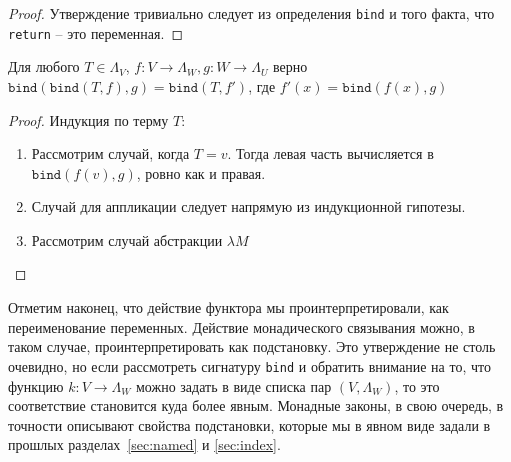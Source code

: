\begin{proof}
  Утверждение тривиально следует из определения \texttt{bind} и того факта, что \texttt{return} -- это переменная.
\end{proof}

\begin{prop}
  Для любого $T \in \Lambda_{V}$, $f : V \to \Lambda_{W}, g : W \to \Lambda_{U}$ верно $\texttt{bind}(\texttt{bind}(T, f), g) = \texttt{bind}(T, f')$, где $f'(x) = \texttt{bind}(f(x), g)$
\end{prop}

\begin{proof}
  Индукция по терму $T$:
  \begin{enumerate}
    \item Рассмотрим случай, когда $T = v$. Тогда левая часть вычисляется в $\texttt{bind}(f(v), g)$, ровно как и правая.
    \item Случай для аппликации следует напрямую из индукционной гипотезы.
    \item Рассмотрим случай абстракции $\lambda M$
  \end{enumerate}
\end{proof}


Отметим наконец, что действие функтора мы проинтерпретировали, как переименование переменных. Действие монадического связывания можно, в таком случае, проинтерпретировать как подстановку. Это утверждение не столь очевидно, но если рассмотреть сигнатуру \texttt{bind} и обратить внимание на то, что функцию $k : V \to \Lambda_{W}$ можно задать в виде списка пар $(V, \Lambda_{W})$, то это соответствие становится куда более явным. Монадные законы, в свою очередь, в точности описывают свойства подстановки, которые мы в явном виде задали в прошлых разделах~\ref{sec:named} и \ref{sec:index}.
